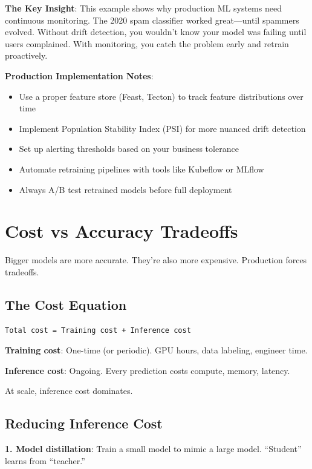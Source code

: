 \documentclass[11pt,oneside]{book}
\begin{document}
\textbf{The Key Insight}: This example shows why production ML systems need continuous monitoring. The 2020 spam classifier worked great---until spammers evolved. Without drift detection, you wouldn't know your model was failing until users complained. With monitoring, you catch the problem early and retrain proactively.

\textbf{Production Implementation Notes}:
\begin{itemize}
\item Use a proper feature store (Feast, Tecton) to track feature distributions over time
\item Implement Population Stability Index (PSI) for more nuanced drift detection
\item Set up alerting thresholds based on your business tolerance
\item Automate retraining pipelines with tools like Kubeflow or MLflow
\item Always A/B test retrained models before full deployment
\end{itemize}

\section{Cost vs Accuracy Tradeoffs}

Bigger models are more accurate. They're also more expensive. Production forces tradeoffs.

\subsection{The Cost Equation}

\begin{lstlisting}
Total cost = Training cost + Inference cost
\end{lstlisting}

\textbf{Training cost}: One-time (or periodic). GPU hours, data labeling, engineer time.

\textbf{Inference cost}: Ongoing. Every prediction costs compute, memory, latency.

At scale, inference cost dominates.

\subsection{Reducing Inference Cost}

\textbf{1. Model distillation}: Train a small model to mimic a large model. ``Student'' learns from ``teacher.''
\end{document}
